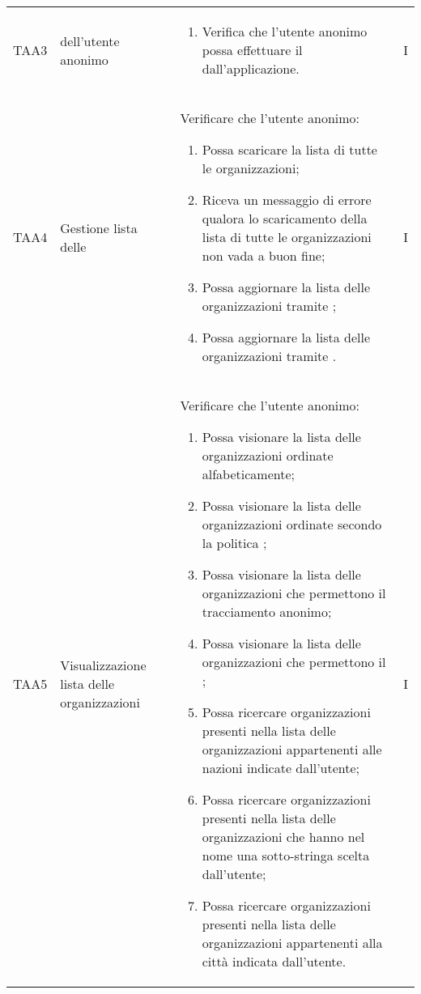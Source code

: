 {\begin{longtable}{ c  C{2.5cm}  C{10cm} C{1cm}}
TAA3  &  dell'utente anonimo & \begin{enumerate}
    \item Verifica che l'utente anonimo possa effettuare il  dall'applicazione.
\end{enumerate} & I \\

TAA4 & Gestione lista delle  &
Verificare che l'utente anonimo:
\begin{enumerate}
    \item Possa scaricare la lista di tutte le organizzazioni;
    \item Riceva un messaggio di errore qualora lo scaricamento della lista di tutte le organizzazioni non vada a buon fine;
    \item Possa aggiornare la lista delle organizzazioni tramite ;
    \item Possa aggiornare la lista delle organizzazioni tramite .
\end{enumerate} & I \\

TAA5 & Visualizzazione lista delle organizzazioni & 
Verificare che l'utente anonimo:
\begin{enumerate}
    \item Possa visionare la lista delle organizzazioni ordinate alfabeticamente;
    \item Possa visionare la lista delle organizzazioni ordinate secondo la politica ;
    \item Possa visionare la lista delle organizzazioni che permettono il tracciamento anonimo;
    \item Possa visionare la lista delle organizzazioni che permettono il ;
    \item Possa ricercare organizzazioni presenti nella lista delle organizzazioni appartenenti alle nazioni indicate dall'utente;
    \item Possa ricercare organizzazioni presenti nella lista delle organizzazioni che hanno nel nome una sotto-stringa scelta dall'utente;
    \item Possa ricercare organizzazioni presenti nella lista delle organizzazioni appartenenti alla città indicata dall'utente.
\end{enumerate} & I \\


\end{longtable}}
